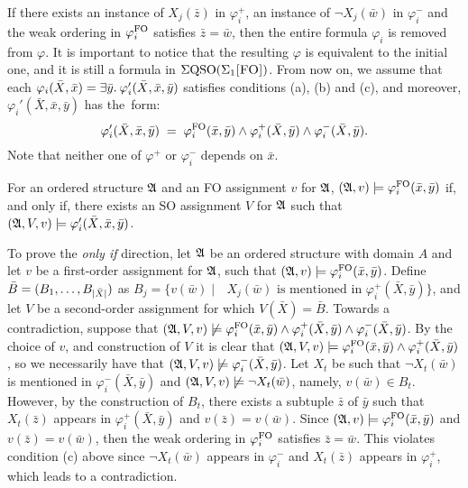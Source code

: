 If there exists an instance of $X_j(\bar{z})$ in $\varphi^{+}_i$, an instance of $\neg X_j(\bar{w})$ in $\varphi^{-}_i$ and the weak ordering in $\varphi^{{\rm FO}}_i$ satisfies $\bar{z} = \bar{w}$, then the entire formula $\varphi_i$ is removed from $\varphi$.
It is important to notice that the resulting $\varphi$ is equivalent to the initial one, and it is still a formula in $\Sigma{\rm QSO}(\Sigma_{1}\textsc{[FO]})$. From now on, we assume that each $\varphi_i(\bar{X},\bar{x}) = \exists{\bar{y}}.\:  \varphi_i'(\bar{X},\bar{x}, \bar{y}) $ satisfies conditions (a), (b) and (c), and moreover, $\varphi_i'(\bar{X},\bar{x}, \bar{y})$ has the~form:
$$
\varphi_i'(\bar{X},\bar{x}, \bar{y}) \; = \; \varphi^{{\rm FO}}_i(\bar{x},\bar{y}) \wedge \varphi^{+}_i(\bar{X}, \bar{y}) \wedge \varphi^{-}_i(\bar{X},\bar{y}).
$$
Note that neither one of $\varphi^{+}$ or $\varphi^{-}_i$ depends on $\bar{x}$.
\begin{clm}\label{claim:minusone}
	For an ordered structure $\mathfrak{A}$ and an FO assignment $v$ for $\mathfrak{A}$, $(\mathfrak{A},v)\models\varphi^{{\rm FO}}_i(\bar{x},\bar{y})$ if, and only if, there exists an SO assignment $V$ for $\mathfrak{A}$ such that $(\mathfrak{A},V,v)\models \varphi_i'(\bar{X},\bar{x}, \bar{y})$.
\end{clm}
\proof
	To prove the {\em only if} direction, let $\mathfrak{A}$ be an ordered structure with domain $A$ and let $v$ be a first-order assignment for $\mathfrak{A}$, such that $(\mathfrak{A},v)\models\varphi^{{\rm FO}}_i(\bar{x},\bar{y})$.
	Define $\bar{B} = (B_1,\ldots,B_{\vert \bar{X} \vert})$ as $B_j = \{v(\bar{w})\mid \text{ $X_j(\bar{w})$ is mentioned in $\varphi^{+}_i(\bar{X},\bar{y})$}\}$, and let $V$ be a second-order assignment for which $V(\bar{X}) = \bar{B}$.
	Towards a contradiction, suppose that $(\mathfrak{A},V,v)\not\models \varphi^{{\rm FO}}_i(\bar{x},\bar{y}) \wedge \varphi^{+}_i(\bar{X}, \bar{y}) \wedge \varphi^{-}_i(\bar{X},\bar{y})$.
	By the choice of $v$, and construction of $V$ it is clear that $(\mathfrak{A},V,v)\models\varphi^{{\rm FO}}_i(\bar{x},\bar{y})\wedge\varphi^{+}_i(\bar{X},\bar{y})$, so we necessarily have that $(\mathfrak{A},V,v)\not\models\varphi^{-}_i(\bar{X},\bar{y})$.
	Let $X_t$ be such that $\neg X_t(\bar{w})$ is mentioned in $\varphi^{-}_i(\bar{X},\bar{y})$ and $(\mathfrak{A},V, v)\not\models\neg X_t(\bar{w})$, namely, $v(\bar{w})\in B_t$. 
	However, by the construction of $B_t$, there exists a subtuple $\bar{z}$ of $\bar{y}$ such that $X_t(\bar{z})$ appears in $\varphi^{+}_i(\bar{X},\bar{y})$ and $v(\bar{z}) = v(\bar{w})$. Since $(\mathfrak{A},v)\models\varphi^{{\rm FO}}_i(\bar{x},\bar{y})$ and $v(\bar{z}) = v(\bar{w})$, then the weak ordering in $\varphi^{{\rm FO}}_i$ satisfies $\bar{z} = \bar{w}$. This violates condition (c) above since $\neg X_t(\bar{w})$ appears in $\varphi^{-}_i$ and $X_t(\bar{z})$ appears in $\varphi^{+}_i$, which leads to a contradiction. 
	
